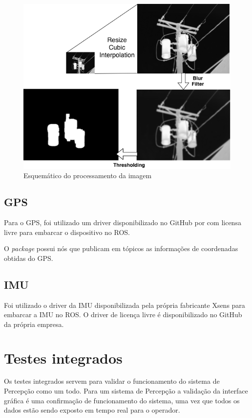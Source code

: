     \begin{figure}[!ht]
    	\centering
    	\includegraphics[width=14cm]{Figures/image_proc.png}
    	\caption{Esquemático do processamento da imagem} \label{imgproc}
	\end{figure}
     
     \subsection{GPS}
     
     Para o GPS, foi utilizado um driver disponibilizado no GitHub por  com licensa livre para embarcar o dispositivo no ROS.
     
     O \textit{package} possui nós que publicam em tópicos as informações de coordenadas obtidas do GPS.
     
     \subsection{IMU}
    Foi utilizado o driver da IMU disponibilizada pela própria fabricante Xsens para embarcar a IMU no ROS. O driver de licença livre é disponibilizado no GitHub da própria empresa.
\section{Testes integrados}
\label{sec:testi}

Os testes integrados servem para validar o funcionamento do sistema de Percepção como um  todo. Para um sistema de Percepção a validação da interface gráfica é uma confirmação de funcionamento do sistema, uma vez que todos os dados estão sendo exposto em tempo real para o operador. 

